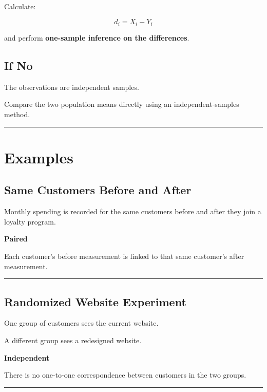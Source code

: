 \documentclass[
  letterpaper,
  DIV=11,
  numbers=noendperiod]{scrreprt}
\begin{document}
Calculate:

\[
d_i=X_i-Y_i
\]

and perform \textbf{one-sample inference on the differences}.

\subsection{If No}\label{if-no}

The observations are independent samples.

Compare the two population means directly using an independent-samples
method.

\begin{center}\rule{0.5\linewidth}{0.5pt}\end{center}

\section{Examples}\label{examples}

\subsection{Same Customers Before and
After}\label{same-customers-before-and-after}

Monthly spending is recorded for the same customers before and after
they join a loyalty program.

\textbf{Paired}

Each customer's before measurement is linked to that same customer's
after measurement.

\begin{center}\rule{0.5\linewidth}{0.5pt}\end{center}

\subsection{Randomized Website
Experiment}\label{randomized-website-experiment}

One group of customers sees the current website.

A different group sees a redesigned website.

\textbf{Independent}

There is no one-to-one correspondence between customers in the two
groups.

\begin{center}\rule{0.5\linewidth}{0.5pt}\end{center}
\end{document}
